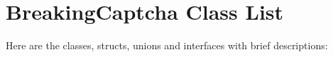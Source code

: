 \section{Breaking\-Captcha Class List}
Here are the classes, structs, unions and interfaces with brief descriptions:\begin{CompactList}
\item{}
\item{}
\end{CompactList}

